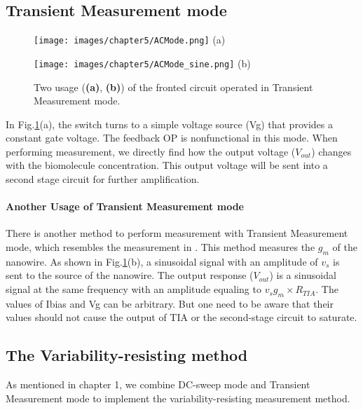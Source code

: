 \subsection{Transient Measurement mode} \label{sec:TrM}

\begin{figure}[!htbp]
    \centering
    \begin{minipage}[t]{0.45\textwidth}
        \texttt{[image: images/chapter5/ACMode.png]}
        \raggedleft
        (a)
    \end{minipage}
    \hfill
    \begin{minipage}[t]{0.45\textwidth}
        \texttt{[image: images/chapter5/ACMode\_sine.png]}
        \raggedleft
        (b)
    \end{minipage}
    \caption{Two usage (\textbf{(a)}, \textbf{(b)}) of the fronted circuit operated in Transient Measurement mode.}
    \label{fig:ACmode}
\end{figure}

In Fig.\ref{fig:ACmode}(a), the switch turns to a simple voltage source (Vg) that provides a constant gate voltage.
The feedback OP is nonfunctional in this mode.
When performing measurement, we directly find how the output voltage ($V_{out}$) changes with the biomolecule concentration.
This output voltage will be sent into a second stage circuit for further amplification.

\paragraph*{Another Usage of Transient Measurement mode}
There is another method to perform measurement with Transient Measurement mode, which resembles the measurement in \cite{Jlockin}.
This method measures the $g_m$ of the nanowire.
As shown in Fig.\ref{fig:ACmode}(b), a sinusoidal signal with an amplitude of $v_s$ is sent to the source of the nanowire.
The output response ($V_{out}$) is a sinusoidal signal at the same frequency with an amplitude equaling to $v_sg_m \times R_{TIA}$.
The values of Ibias and Vg can be arbitrary.
But one need to be aware that their values should not cause the output of TIA or the second-stage circuit to saturate.

\subsection{The Variability-resisting method}
As mentioned in chapter 1, we combine DC-sweep mode and Transient Measurement mode to implement the variability-resisting measurement method.

